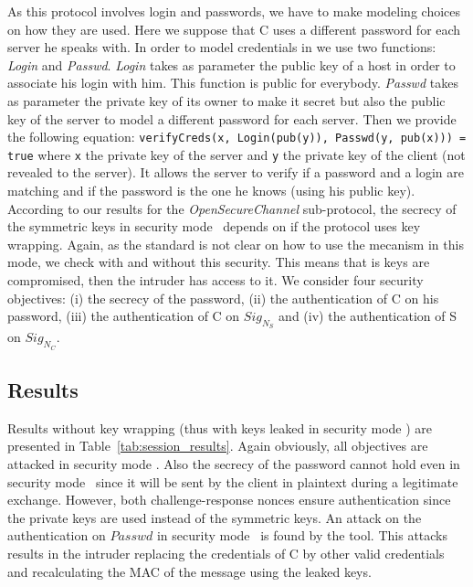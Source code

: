 As this protocol involves login and passwords, we have to make
modeling choices on how they are used.  Here we suppose that C uses a
different password for each server he speaks with.  In order to model
credentials in \proverif we use two functions: {\em Login} and {\em
  Passwd}.  {\em Login} takes as parameter the public key of a host in
order to associate his login with him. This function is public for
everybody.  {\em Passwd} takes as parameter the private key of its
owner to make it secret but also the public key of the server to model
a different password for each server.  Then we provide the following
equation: \texttt{verifyCreds(x, Login(pub(y)), Passwd(y, pub(x))) =
  true} where \texttt{x} the private key of the server and \texttt{y}
the private key of the client (not revealed to the server).  It allows
the server to verify if a password and a login are matching and if the
password is the one he knows (using his public key).
According to our results for the {\em OpenSecureChannel} sub-protocol, the
secrecy of the symmetric keys in security mode \sms~depends on if the protocol
uses key wrapping.
Again, as the \opcua standard is not clear on how to use the mecanism in
this mode, we check with and without this security.
This means that is keys are compromised, then the intruder has access to it.
We consider four security objectives: (i) the secrecy of the
password, (ii) the authentication of C on his password, (iii) the
authentication of C on $Sig_{N_{S}}$ and (iv) the authentication of S on
$Sig_{N_{C}}$.

\subsection{Results}

Results without key wrapping (thus with keys leaked in security mode \sms) are
presented in Table~\ref{tab:session_results}.
Again obviously, all objectives are attacked in security mode \smn.
Also the secrecy of the password cannot hold even in security mode \sms~since
it will be sent by the client in plaintext during a legitimate exchange.
However, both challenge-response nonces ensure authentication since the private
keys are used instead of the symmetric keys.
An attack on the authentication on $Passwd$ in security mode \sms~is found by
the tool.
This attacks results in the intruder replacing the credentials of C by other
valid credentials and recalculating the MAC of the message using the leaked keys.

